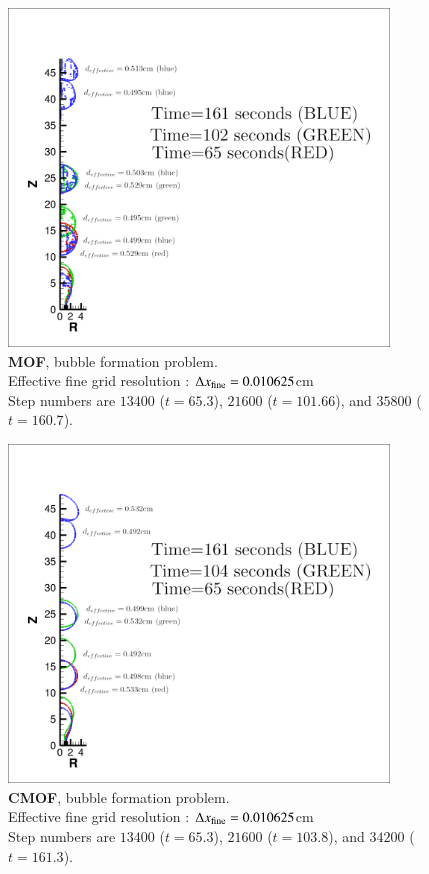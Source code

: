 \documentclass[preprint,12pt]{Definitions/elsarticle}
\newcommand{\tn}{\textnormal}
\begin{document}
\begin{figure}[htbp]
	\centering
	\includegraphics[width=0.9\textwidth]{mof_bubble_formation_april4.png} 
	\caption{\textbf{MOF}, bubble formation problem.  \\
		Effective fine grid resolution : $\Delta x_\tn{fine}=0.010625$cm\\
		Step numbers are $13400$ ($t=65.3$), $21600$ ($t=101.66$), and $35800$ ($t=160.7$).}
	\label{MOF_bubble_formation}
\end{figure}
\begin{figure}[htbp]
	\centering
	\includegraphics[width=0.9\textwidth]{cmof_bubble_formation_april4.png} 
	\caption{\textbf{CMOF}, bubble formation problem.  \\
		Effective fine grid resolution : $\Delta x_\tn{fine}=0.010625$cm\\
		Step numbers are $13400$ ($t=65.3$), $21600$ ($t=103.8$), and $34200$ ($t=161.3$).}
	\label{CMOF_bubble_formation}
\end{figure}
\end{document}
